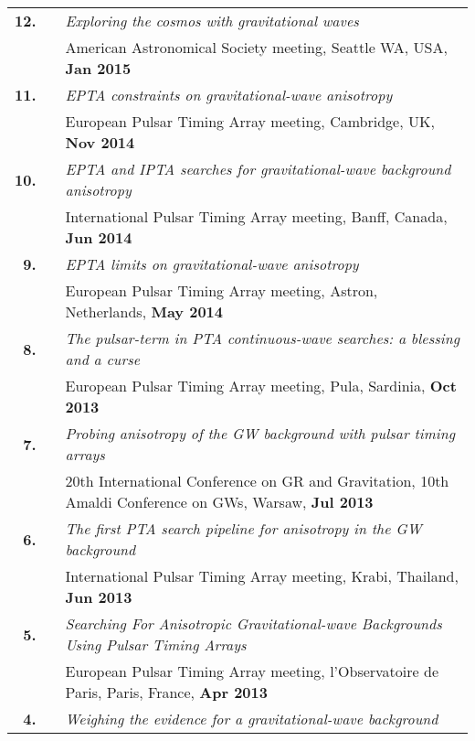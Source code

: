 \documentclass[11pt,letterpaper,sans]{moderncv}
\begin{document}
{\begin{longtable}{rp{0.3cm}p{15.8cm}}
\textbf{12.} & & \textit{Exploring the cosmos with gravitational waves} \\ 
&& American Astronomical Society meeting, Seattle WA, USA, \textbf{Jan 2015} \vspace{0.09cm}\\
\textbf{11.} & & \textit{EPTA constraints on gravitational-wave anisotropy} \\ 
&& European Pulsar Timing Array meeting, Cambridge, UK, \textbf{Nov 2014} \vspace{0.09cm}\\
\textbf{10.} & & \textit{EPTA and IPTA searches for gravitational-wave background anisotropy} \\ 
&& International Pulsar Timing Array meeting, Banff, Canada, \textbf{Jun 2014} \vspace{0.09cm}\\
\textbf{9.} & & \textit{EPTA limits on gravitational-wave anisotropy} \\ 
&& European Pulsar Timing Array meeting, Astron, Netherlands, \textbf{May 2014} \vspace{0.09cm}\\
\textbf{8.} & & \textit{The pulsar-term in PTA continuous-wave searches: a blessing and a curse} \\ 
&& European Pulsar Timing Array meeting, Pula, Sardinia, \textbf{Oct 2013} \vspace{0.09cm}\\
\textbf{7.} & & \textit{Probing anisotropy of the GW background with pulsar timing arrays} \\ 
&& 20th International Conference on GR and Gravitation, 10th Amaldi Conference on GWs, Warsaw, \textbf{Jul 2013} \vspace{0.09cm}\\
\textbf{6.} & & \textit{The first PTA search pipeline for anisotropy in the GW background} \\ 
&& International Pulsar Timing Array meeting, Krabi, Thailand, \textbf{Jun 2013} \vspace{0.09cm}\\
\textbf{5.} & & \textit{Searching For Anisotropic Gravitational-wave Backgrounds Using Pulsar Timing Arrays} \\ 
&& European Pulsar Timing Array meeting, l'Observatoire de Paris, Paris, France, \textbf{Apr 2013} \vspace{0.09cm}\\
\textbf{4.} & & \textit{Weighing the evidence for a gravitational-wave background} \\ 

\end{longtable}}
\end{document}
